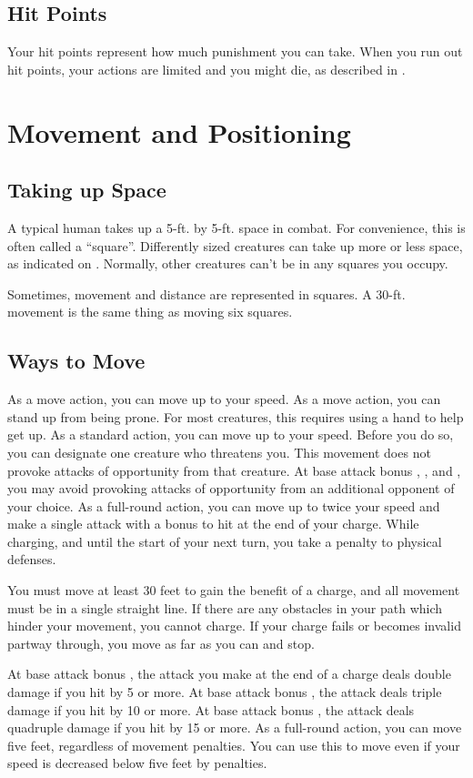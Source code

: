 \subsection{Hit Points}
Your hit points represent how much punishment you can take. When you run out hit points, your actions are limited and you might die, as described in .

\section{Movement and Positioning}\label{Movement and Positioning}

\subsection{Taking up Space}
A typical human takes up a 5-ft. by 5-ft. space in combat. For convenience, this is often called a ``square''. Differently sized creatures can take up more or less space, as indicated on . Normally, other creatures can't be in any squares you occupy.

Sometimes, movement and distance are represented in squares. A 30-ft. movement is the same thing as moving six squares.

\subsection{Ways to Move}

 As a move action, you can move up to your speed.
 As a move action, you can stand up from being prone. For most creatures, this requires using a hand to help get up.
\label{Withdraw} As a standard action, you can move up to your speed. Before you do so, you can designate one creature who threatens you. This movement does not provoke attacks of opportunity from that creature. At base attack bonus , , and , you may avoid provoking attacks of opportunity from an additional opponent of your choice.
\label{Charge} As a full-round action, you can move up to twice your speed and make a single attack with a  bonus to hit at the end of your charge. While charging, and until the start of your next turn, you take a  penalty to physical defenses.
\par You must move at least 30 feet to gain the benefit of a charge, and all movement must be in a single straight line. If there are any obstacles in your path which hinder your movement, you cannot charge. If your charge fails or becomes invalid partway through, you move as far as you can and stop.
\par  At base attack bonus , the attack you make at the end of a charge deals double damage if you hit by 5 or more. At base attack bonus , the attack deals triple damage if you hit by 10 or more. At base attack bonus , the attack deals quadruple damage if you hit by 15 or more.
 As a full-round action, you can move five feet, regardless of movement penalties. You can use this to move even if your speed is decreased below five feet by penalties.

